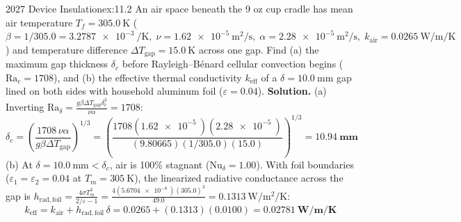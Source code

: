 \begin{workedexample}{2027 Device Insulation}{ex:11.2}
An air space beneath the 9 oz cup cradle has mean air temperature $T_f = \SI{305.0}{\kelvin}$ ($\beta = 1/305.0 = \SI{3.2787e-3}{\per\kelvin},\; \nu = \SI{1.62e-5}{\square\meter\per\second},\; \alpha = \SI{2.28e-5}{\square\meter\per\second},\; k_{\mathrm{air}} = \SI{0.0265}{\watt\per\meter\per\kelvin}$) and temperature difference $\Delta T_{\mathrm{gap}} = \SI{15.0}{\kelvin}$ across one gap. Find (a) the maximum gap thickness $\delta_c$ before Rayleigh--B\'enard cellular convection begins ($\mathrm{Ra}_c = 1708$), and (b) the effective thermal conductivity $k_{\mathrm{eff}}$ of a $\delta = \SI{10.0}{\milli\meter}$ gap lined on both sides with household aluminum foil ($\varepsilon = 0.04$).
\tcblower
\textbf{Solution.} (a) Inverting $\mathrm{Ra}_\delta = \frac{g\beta\Delta T_{\mathrm{gap}}\delta_c^3}{\nu\alpha} = 1708$:
\[
  \delta_c = \left(\frac{1708\,\nu\alpha}{g\beta\Delta T_{\mathrm{gap}}}\right)^{\!1/3} = \left(\frac{1708(\SI{1.62e-5}{})(\SI{2.28e-5}{})}{(9.80665)(1/305.0)(15.0)}\right)^{\!1/3} = \mathbf{\SI{10.94}{\milli\meter}}
\]
(b) At $\delta = \SI{10.0}{\milli\meter} < \delta_c$, air is 100\% stagnant ($\mathrm{Nu}_\delta = 1.00$). With foil boundaries ($\varepsilon_1 = \varepsilon_2 = 0.04$ at $T_m = \SI{305}{\kelvin}$), the linearized radiative conductance across the gap is $h_{\mathrm{rad,foil}} = \frac{4\sigma T_m^3}{2/\varepsilon - 1} = \frac{4(\SI{5.6704e-8}{})(305.0)^3}{49.0} = \SI{0.1313}{\watt\per\square\meter\per\kelvin}$:
\[
  k_{\mathrm{eff}} = k_{\mathrm{air}} + h_{\mathrm{rad,foil}}\,\delta = 0.0265 + (0.1313)(0.0100) = \mathbf{\SI{0.02781}{\watt\per\meter\per\kelvin}}
\]
\end{workedexample}

